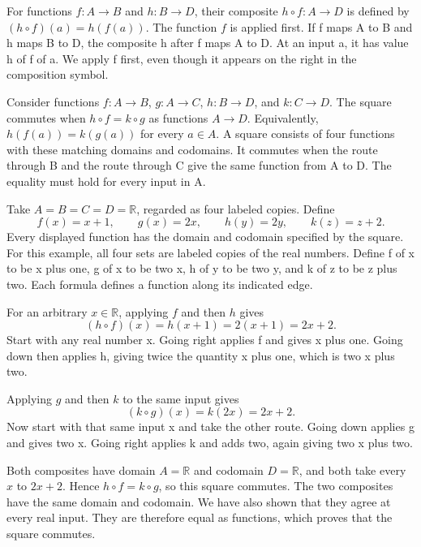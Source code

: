 \documentclass{article}
\begin{document}

{For functions $f:A\to B$ and $h:B\to D$, their composite $h\circ f:A\to D$ is defined by $(h\circ f)(a)=h(f(a))$. The function $f$ is applied first.}
{If f maps A to B and h maps B to D, the composite h after f maps A to D. At an input a, it has value h of f of a. We apply f first, even though it appears on the right in the composition symbol.}

{Consider functions $f:A\to B$, $g:A\to C$, $h:B\to D$, and $k:C\to D$. The square commutes when $h\circ f=k\circ g$ as functions $A\to D$. Equivalently, $h(f(a))=k(g(a))$ for every $a\in A$.}
{A square consists of four functions with these matching domains and codomains. It commutes when the route through B and the route through C give the same function from A to D. The equality must hold for every input in A.}

{Take $A=B=C=D=\mathbb R$, regarded as four labeled copies. Define
\[f(x)=x+1,\qquad g(x)=2x,\qquad h(y)=2y,\qquad k(z)=z+2.\]
Every displayed function has the domain and codomain specified by the square.}
{For this example, all four sets are labeled copies of the real numbers. Define f of x to be x plus one, g of x to be two x, h of y to be two y, and k of z to be z plus two. Each formula defines a function along its indicated edge.}

{For an arbitrary $x\in\mathbb R$, applying $f$ and then $h$ gives
\[(h\circ f)(x)=h(x+1)=2(x+1)=2x+2.\]}
{Start with any real number x. Going right applies f and gives x plus one. Going down then applies h, giving twice the quantity x plus one, which is two x plus two.}

{Applying $g$ and then $k$ to the same input gives
\[(k\circ g)(x)=k(2x)=2x+2.\]}
{Now start with that same input x and take the other route. Going down applies g and gives two x. Going right applies k and adds two, again giving two x plus two.}

{Both composites have domain $A=\mathbb R$ and codomain $D=\mathbb R$, and both take every $x$ to $2x+2$. Hence $h\circ f=k\circ g$, so this square commutes.}
{The two composites have the same domain and codomain. We have also shown that they agree at every real input. They are therefore equal as functions, which proves that the square commutes.}
\end{document}
